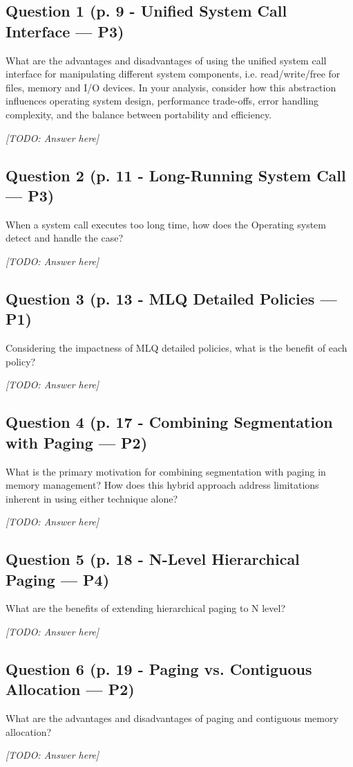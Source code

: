 \documentclass[11pt,a4paper]{article}
\begin{document}
\subsection{Question 1 (p. 9 - Unified System Call Interface — P3)}
What are the advantages and disadvantages of using the unified system call interface for manipulating different system components, i.e. read/write/free for files, memory and I/O devices. In your analysis, consider how this abstraction influences operating system design, performance trade-offs, error handling complexity, and the balance between portability and efficiency.
\par\noindent\textit{[TODO: Answer here]}

\subsection{Question 2 (p. 11 - Long-Running System Call — P3)}
When a system call executes too long time, how does the Operating system detect and handle the case?
\par\noindent\textit{[TODO: Answer here]}

\subsection{Question 3 (p. 13 - MLQ Detailed Policies — P1)}
Considering the impactness of MLQ detailed policies, what is the benefit of each policy?
\par\noindent\textit{[TODO: Answer here]}

\subsection{Question 4 (p. 17 - Combining Segmentation with Paging — P2)}
What is the primary motivation for combining segmentation with paging in memory management? How does this hybrid approach address limitations inherent in using either technique alone?
\par\noindent\textit{[TODO: Answer here]}

\subsection{Question 5 (p. 18 - N-Level Hierarchical Paging — P4)}
What are the benefits of extending hierarchical paging to N level?
\par\noindent\textit{[TODO: Answer here]}

\subsection{Question 6 (p. 19 - Paging vs. Contiguous Allocation — P2)}
What are the advantages and disadvantages of paging and contiguous memory allocation?
\par\noindent\textit{[TODO: Answer here]}
\end{document}
